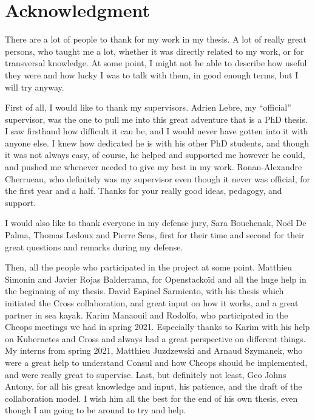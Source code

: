 \chapter*{Acknowledgment}

There are a lot of people to thank for my work in my thesis.
%
A lot of really great persons, who taught me a lot, whether it was
directly related to my work, or for transversal knowledge.
%
At some point, I might not be able to describe how useful they were
and how lucky I was to talk with them, in good enough terms, but I
will try anyway.

First of all, I would like to thank my
supervisors.
%
Adrien Lebre, my ``official'' supervisor, was the one to pull me into
this great adventure that is a PhD thesis.
%
I saw firsthand how difficult it can be, and I would never have gotten
into it with anyone else.
%
I knew how dedicated he is with his other PhD students, and though it
was not always easy, of course, he helped and supported me however he
could, and pushed me whenever needed to give my best in my work.
%
Ronan-Alexandre Cherrueau, who definitely was my supervisor even
though it never was official, for the first year and a half.
%
Thanks for your really good ideas, pedagogy, and support.

I would also like to thank everyone in my defense jury, Sara
Bouchenak, Noël De Palma, Thomas Ledoux and Pierre Sens, first for
their time and second for their great questions and remarks during my
defense.

Then, all the people who participated in the project at some point.
%
Matthieu Simonin and Javier Rojas Balderrama, for Openstackoïd and all
the huge help in the beginning of my thesis.
%
David Espinel Sarmiento, with his thesis which initiated the Cross
collaboration, and great input on how it works, and a great partner in
sea kayak.
%
Karim Manaouil and Rodolfo, who participated in the Cheops meetings we
had in spring 2021.
%
Especially thanks to Karim with his help on Kubernetes and Cross and
always had a great perspective on different things.
%
My interns from spring 2021, Matthieu Juzdzewski and Arnaud Szymanek,
who were a great help to understand Consul and how Cheops should be
implemented, and were really great to supervise.
%
Last, but definitely not least, Geo Johns Antony, for all his great
knowledge and input, his patience, and the draft of the collaboration
model.
%
I wish him all the best for the end of his own thesis, even though I
am going to be around to try and help.


